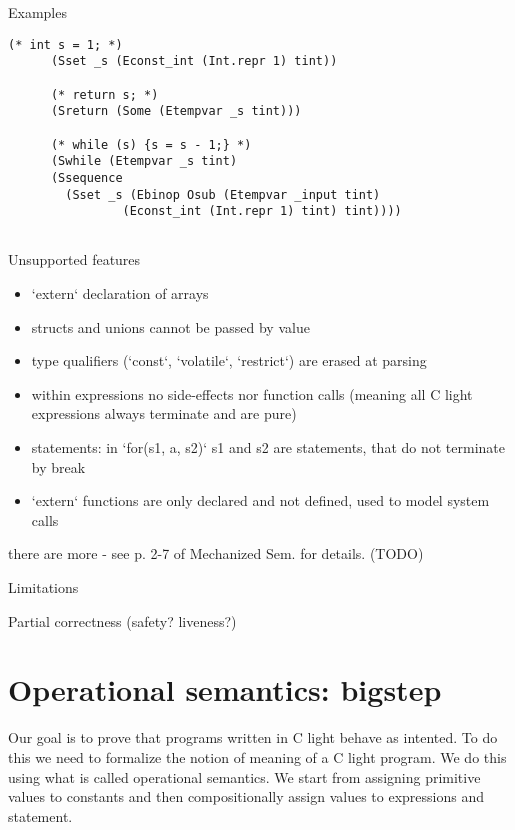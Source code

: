 \documentclass{beamer}
\begin{document}
\begin{frame}[fragile]{Examples}

  \begin{lstlisting}[language=Coq]
     (* int s = 1; *)
      (Sset _s (Econst_int (Int.repr 1) tint))

      (* return s; *)
      (Sreturn (Some (Etempvar _s tint)))

      (* while (s) {s = s - 1;} *)
      (Swhile (Etempvar _s tint) 
      (Ssequence  
        (Sset _s (Ebinop Osub (Etempvar _input tint)
                (Econst_int (Int.repr 1) tint) tint))))


  \end{lstlisting}
  


\end{frame}

\begin{frame}{Unsupported features}
  \begin{itemize}
  \item `extern` declaration of arrays
\item structs and unions cannot be passed by value
\item  type qualifiers (`const`, `volatile`, `restrict`) are erased at parsing
\item within expressions no side-effects nor function calls (meaning all C light expressions always terminate and are pure)
\item statements: in `for(s1, a, s2)` s1 and s2 are statements, that do not terminate by break
\item `extern` functions are only declared and not defined, used to model system calls
\end{itemize}
there are more - see p. 2-7 of Mechanized Sem. for details. (TODO)
  
  \end{frame}
\begin{frame}
  
  Limitations

  Partial correctness (safety? liveness?)
  
  \end{frame}

  \section{Operational semantics: bigstep}

  
  \begin{frame}

     Our goal is to prove that programs written in C light behave as intented. To do this we need to formalize the notion of meaning of a C light program. We do this using what is called operational semantics. We start from assigning primitive values to constants and then compositionally assign values to expressions and statement. 
      
   \end{frame}
\end{document}
